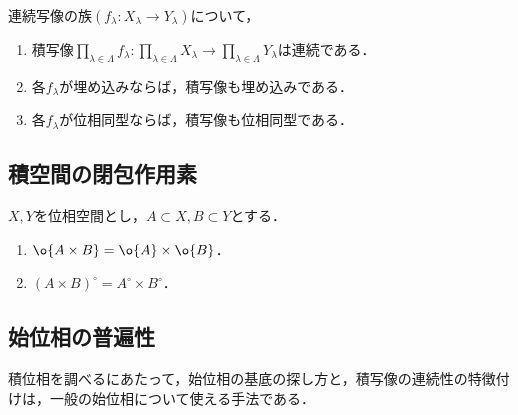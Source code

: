 \documentclass[uplatex,dvipdfmx]{jsreport}
\begin{document}
\begin{theorem}
    連続写像の族$(f_\lambda:X_\lambda\to Y_\lambda)$について，
    \begin{enumerate}
        \item 積写像$\prod_{\lambda\in\Lambda}f_\lambda:\prod_{\lambda\in\Lambda}X_\lambda\to\prod_{\lambda\in\Lambda}Y_\lambda$は連続である．
        \item 各$f_\lambda$が埋め込みならば，積写像も埋め込みである．
        \item 各$f_\lambda$が位相同型ならば，積写像も位相同型である．
    \end{enumerate}
\end{theorem}

\subsection{積空間の閉包作用素}

\begin{proposition}
    $X,Y$を位相空間とし，$A\subset X,B\subset Y$とする．
    \begin{enumerate}
        \item $\o{A\times B}=\o{A}\times\o{B}$．
        \item $(A\times B)^\circ=A^\circ\times B^\circ$．
    \end{enumerate}
\end{proposition}

\subsection{始位相の普遍性}

\begin{tcolorbox}[colframe=ForestGreen, colback=ForestGreen!10!white,breakable,colbacktitle=ForestGreen!40!white,coltitle=black,fonttitle=\bfseries\sffamily,
title=]
    積位相を調べるにあたって，始位相の基底の探し方と，積写像の連続性の特徴付けは，一般の始位相について使える手法である．
\end{tcolorbox}
\end{document}
